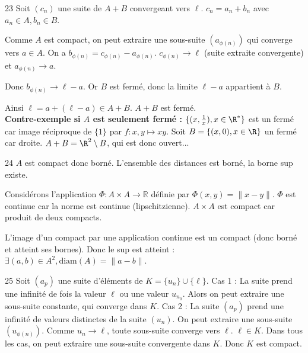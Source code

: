 \begin{correction}{23}
Soit $(c_{n})$ une suite de $A+B$ convergeant vers $\ell$.
$c_{n} = a_{n} + b_{n}$ avec $a_{n} \in A, b_{n} \in B$.

Comme $A$ est compact, on peut extraire une sous-suite $(a_{\phi(n)})$ qui converge vers $a \in A$.
On a $b_{\phi(n)} = c_{\phi(n)} - a_{\phi(n)}$.
$c_{\phi(n)} \to \ell$ (suite extraite convergente) et $a_{\phi(n)} \to a$.

Donc $b_{\phi(n)} \to \ell - a$.
Or $B$ est fermé, donc la limite $\ell - a$ appartient à $B$.

Ainsi $\ell = a + (\ell - a) \in A + B$.
$A+B$ est fermé. \\

\textbf{Contre-exemple si $A$ est seulement fermé :} $\{(x, \frac 1 x), x \in \R^*\}$ est un fermé car image réciproque de $\{1\}$ par $f: x,y \mapsto xy$. 
Soit $B = \{(x, 0), x \in \R\}$ un fermé car droite. $A + B = \R^2 \setminus B$, qui est donc ouvert...
\end{correction}

\begin{correction}{24}
$A$ est compact donc borné. L'ensemble des distances est borné, la borne sup existe.

Considérons l'application $\Phi : A \times A \rightarrow \mathbb{R}$ définie par $\Phi(x,y) = \|x-y\|$.
$\Phi$ est continue car la norme est continue (lipschitzienne).
$A \times A$ est compact car produit de deux compacts.

L'image d'un compact par une application continue est un compact (donc borné et atteint ses bornes).
Donc le sup est atteint : $\exists (a,b) \in A^{2}, \text{diam}(A) = \|a-b\|$.
\end{correction}

\begin{correction}{25}
Soit $(a_{p})$ une suite d'éléments de $K = \{u_{n}\} \cup \{\ell\}$.
Cas 1 : La suite prend une infinité de fois la valeur $\ell$ ou une valeur $u_{n_0}$. Alors on peut extraire une sous-suite constante, qui converge dans $K$.
Cas 2 : La suite $(a_{p})$ prend une infinité de valeurs distinctes de la suite $(u_{n})$.
On peut extraire une sous-suite $(u_{\phi(n)})$.
Comme $u_{n} \to \ell$, toute sous-suite converge vers $\ell$.
$\ell \in K$.
Dans tous les cas, on peut extraire une sous-suite convergente dans $K$.
Donc $K$ est compact.
\end{correction}

